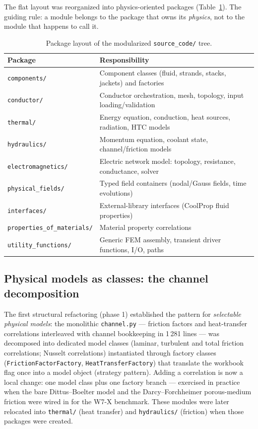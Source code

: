 \documentclass[11pt,a4paper]{article}
\newcommand{\code}[1]{\texttt{#1}}
\begin{document}
The flat layout was reorganized into physics-oriented packages
(Table~\ref{tab:packages}). The guiding rule: a module belongs to the package that
owns its \emph{physics}, not to the module that happens to call it.

\begin{table}[ht]
  \centering
  \caption{Package layout of the modularized \code{source\_code/} tree.}
  \label{tab:packages}
  \begin{tabular}{ll}
    \toprule
    Package & Responsibility \\
    \midrule
    \code{components/}          & Component classes (fluid, strands, stacks, jackets) and factories \\
    \code{conductor/}           & Conductor orchestration, mesh, topology, input loading/validation \\
    \code{thermal/}             & Energy equation, conduction, heat sources, radiation, HTC models \\
    \code{hydraulics/}          & Momentum equation, coolant state, channel/friction models \\
    \code{electromagnetics/}    & Electric network model: topology, resistance, conductance, solver \\
    \code{physical\_fields/}    & Typed field containers (nodal/Gauss fields, time evolutions) \\
    \code{interfaces/}          & External-library interfaces (CoolProp fluid properties) \\
    \code{properties\_of\_materials/} & Material property correlations \\
    \code{utility\_functions/}  & Generic FEM assembly, transient driver functions, I/O, paths \\
    \bottomrule
  \end{tabular}
\end{table}

\subsection{Physical models as classes: the channel decomposition}

The first structural refactoring (phase 1) established the pattern for
\emph{selectable physical models}: the monolithic \code{channel.py} --- friction
factors and heat-transfer correlations interleaved with channel bookkeeping in
1\,281 lines --- was decomposed into dedicated model classes (laminar, turbulent and
total friction correlations; Nusselt correlations) instantiated through factory
classes (\code{FrictionFactorFactory}, \code{HeatTransferFactory}) that translate the
workbook flag once into a model object (strategy pattern). Adding a correlation is now
a local change: one model class plus one factory branch --- exercised in practice when
the bare Dittus--Boelter model and the Darcy--Forchheimer porous-medium friction were
wired in for the W7-X benchmark. These modules were later relocated into
\code{thermal/} (heat transfer) and \code{hydraulics/} (friction) when those packages
were created.
\end{document}
